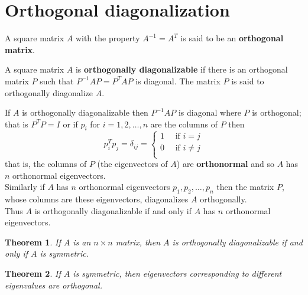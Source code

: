 \documentclass[a4paper, 12pt]{article}
\newtheorem{theorem}{Theorem}[section]
\newenvironment{definition}[1][Definition]{\begin{trivlist}
\item[\hskip \labelsep {\bfseries #1}]}{\end{trivlist}}
\newenvironment{remark}[1][Remark]{\begin{trivlist}
\item[\hskip \labelsep {\bfseries #1}]}{\end{trivlist}}
\newcommand{\keyword}[1]{\textbf{#1}}
\begin{document}
    \section*{Orthogonal diagonalization}
    \begin{definition}
        A square matrix $A$ with the property $A^{-1} = A^T$ is said to be an
        \keyword{orthogonal matrix}.
    \end{definition}
    \begin{definition}
        A square matrix $A$ is \keyword{orthogonally diagonalizable} if there is an
        orthogonal matrix $P$ such that $P^{-1}AP = P^TAP$ is diagonal.
        The matrix $P$ is said to orthogonally diagonalize $A$.
    \end{definition}
    \begin{remark}
        If $A$ is orthogonally diagonalizable then $P^{-1}AP$ is diagonal
        where $P$ is orthogonal;\\
        that is $P^TP = I$ or if $p_i$ for $i = 1, 2, \dots, n$ are the columns of $P$
        then
        \[
            p_i^Tp_j = \delta_{ij} =
            \begin{cases}
                1 \quad \text{ if } i = j \\
                0 \quad \text{ if } i \ne j \\
            \end{cases}
        \]
        that is, the columns of $P$ (the eigenvectors of $A$) are
        \keyword{orthonormal} and so $A$ has $n$ orthonormal eigenvectors.\\
        Similarly if $A$ has $n$ orthonormal eigenvectors $p_1, p_2, \dots, p_n$ then
        the matrix $P$, whose columns are these eigenvectors,
        diagonalizes $A$ orthogonally.\\
        Thus $A$ is orthogonally diagonalizable if and only if $A$ has $n$
        orthonormal eigenvectors.
    \end{remark}
    \begin{theorem}
        If $A$ is an $n \times n$ matrix, then $A$ is orthogonally diagonalizable if
        and only if $A$ is symmetric.
    \end{theorem}
    \begin{theorem}
        If $A$ is symmetric, then eigenvectors corresponding to different
        eigenvalues are orthogonal.
    \end{theorem}
\end{document}
